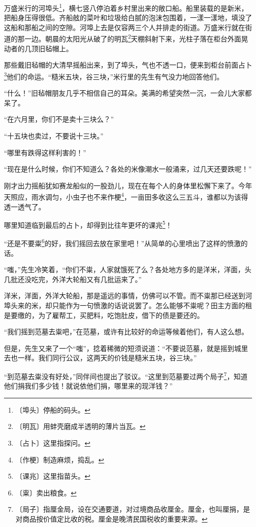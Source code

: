 \documentclass[12pt,UTF-8,openany]{ctexbook}
\begin{document}
\begin{normalsize}
    
    万盛米行的河埠头\footnote{〔埠头〕停船的码头。}，横七竖八停泊着乡村里出来的敞口船。船里装载的是新米，把船身压得很低。齐船舷的菜叶和垃圾给白腻的泡沫包围着，一漾一漾地，填没了这船和那船之间的空隙。河埠上去是仅容两三个人并排走的街道。万盛米行就在街道的那一边。朝晨的太阳光从破了的明瓦\footnote{〔明瓦〕用蚌壳磨成半透明的薄片当瓦。}天棚斜射下来，光柱子落在柜台外面晃动者的几顶旧毡帽上。
    
    那些戴旧毡帽的大清早摇船出来，到了埠头，气也不透一口，便来到柜台前面占卜\footnote{〔占卜〕这里指探问。}他们的命运。“糙米五块，谷三块，”米行里的先生有气没力地回答他们。
    
    “什么！”旧毡帽朋友几乎不相信自己的耳朵。美满的希望突然一沉，一会儿大家都呆了。
    
    “在六月里，你们不是卖十三块么？”
    
    “十五块也卖过，不要说十三块。”
    
    “哪里有跌得这样利害的！”
    
    “现在是什么时候，你们不知道么？各处的米像潮水一般涌来，过几天还要跌呢！”
    
    刚才出力摇船犹如赛龙船似的一股劲儿，现在在每个人的身体里松懈下来了。今年天照应，雨水调匀，小虫子也不来作梗\footnote{〔作梗〕制造麻烦，捣乱。}，一亩田多收这么三五斗，谁都以为该得透一透气了。
    
    哪里知道临到最后的占卜，却得到比往年更坏的课兆\footnote{〔课兆〕这里指苗头。}！
    
    “还是不要粜\footnote{〔粜〕卖出粮食。}的好，我们摇回去放在家里吧！”从简单的心里喷出了这样的愤激的话。
    
    “嗤，”先生冷笑着，“你们不粜，人家就饿死了么？各处地方多的是洋米，洋面，头几批还没吃完，外洋大轮船又有几批运来了。”
    
    洋米，洋面，外洋大轮船，那是遥远的事情，仿佛可以不管。而不粜那已经送到河埠头来的米，却只能作为一句愤激的话说说罢了。怎么能够不粜呢？田主方面的租是要缴的，为了雇帮工，买肥料，吃饱肚皮，借下的债是要还的。
    
    “我们摇到范墓去粜吧，”在范墓，或许有比较好的命运等候着他们，有人这么想。
    
    但是，先生又来了一个“嗤”，捻着稀微的短须说道：“不要说范墓，就是摇到城里去也一样。我们同行公议，这两天的价钱是糙米五块，谷三块。”
    
    “到范墓去粜没有好处，”同伴间也提出了驳议。“这里到范墓要过两个局子\footnote{〔局子〕指厘金局，设在交通要道，对过境商品收厘金。厘金，也叫厘捐，是对商品按价值定比收的税。厘金是晚清民国税收的重要来源。}，知道他们捐我们多少钱！就说依他们捐，哪里来的现洋钱？”
    

\end{normalsize}
\end{document}
